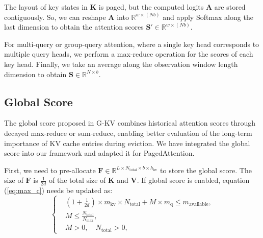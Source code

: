 \documentclass[11pt]{article}
\begin{document}
The layout of key states in $\mathbf{K}$ is paged, but the computed logits $\mathbf{A}$ are stored contiguously. So, we can reshape $\mathbf{A}$ into $\mathbb{R}^{w \times (N b)}$ and apply Softmax along the last dimension to obtain the attention scores $\mathbf{S}' \in \mathbb{R}^{w \times (N b)}$. 

For multi-query \citep{shazeer2019fast} or group-query \citep{ainslie2023gqa} attention, where a single key head corresponds to multiple query heads, we perform a max-reduce operation for the scores of each key head. Finally, we take an average along the observation window length dimension to obtain $\mathbf{S} \in \mathbb{R}^{N \times b}$.





\subsection{Global Score}
\label{sct:global_score}

The global score proposed in G-KV \citep{gkv} combines historical attention scores through decayed max-reduce or sum-reduce, enabling better evaluation of the long-term importance of KV cache entries during eviction. We have integrated the global score into our framework and adapted it for PagedAttention.

First, we need to pre-allocate $\mathbf F \in \mathbb{R}^{L \times N_{\text{total}} \times b \times h_{\text{kv}}}$ to store the global score. The size of $\mathbf F$ is $\frac{1}{2d}$ of the total size of $\mathbf{K}$ and $\mathbf{V}$. If global score is enabled, equation (\ref{eq:max_c}) needs be  updated as:
\begin{equation}  
\left\{
\begin{aligned}
    &(1+\frac{1}{2d})\times m_{\text{kv}} \times N_{\text{total}} + M \times m_{\text{q}} \leq m_{\text{available}}, \\
    &M \leq \frac{N_{\text{total}}}{N_{\max}}, \\
    &M > 0, \quad N_{\text{total}} > 0,
\end{aligned}
\right.
\end{equation}  
\end{document}
